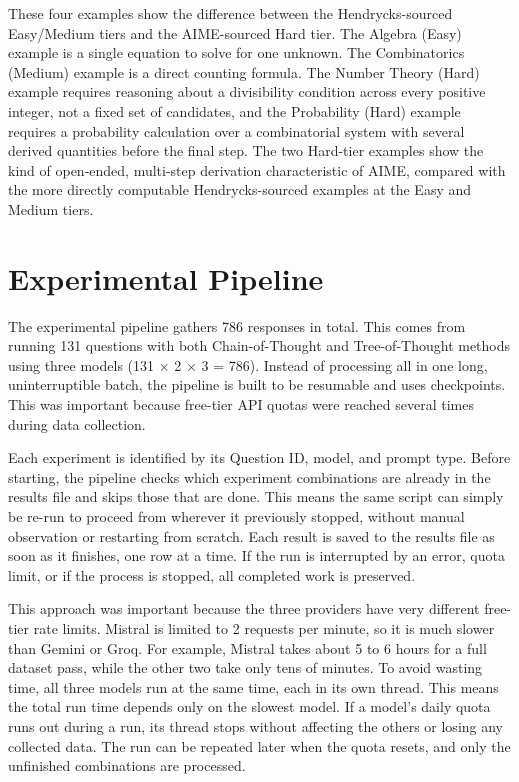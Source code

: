 These four examples show the difference between the Hendrycks-sourced
Easy/Medium tiers and the AIME-sourced Hard tier. The Algebra (Easy)
example is a single equation to solve for one unknown. The
Combinatorics (Medium) example is a direct counting formula. The Number
Theory (Hard) example requires reasoning about a divisibility condition
across every positive integer, not a fixed set of candidates, and the
Probability (Hard) example requires a probability calculation over a
combinatorial system with several derived quantities before the final
step. The two Hard-tier examples show the kind of open-ended,
multi-step derivation characteristic of AIME, compared with the more
directly computable Hendrycks-sourced examples at the Easy and Medium
tiers.

\section{Experimental Pipeline}
\label{sec:pipeline}

The experimental pipeline gathers 786 responses in total. This comes from
running 131 questions with both Chain-of-Thought and Tree-of-Thought
methods using three models (131 $\times$ 2 $\times$ 3 = 786). Instead of
processing all in one long, uninterruptible batch, the pipeline is built
to be resumable and uses checkpoints. This was important because
free-tier API quotas were reached several times during data collection.

Each experiment is identified by its Question ID, model, and prompt type.
Before starting, the pipeline checks which experiment combinations are
already in the results file and skips those that are done. This means
the same script can simply be re-run to proceed from wherever it
previously stopped, without manual observation or restarting from
scratch. Each result is saved to the results file as soon as it
finishes, one row at a time. If the run is interrupted by an error,
quota limit, or if the process is stopped, all completed work is
preserved.

This approach was important because the three providers have very
different free-tier rate limits. Mistral is limited to 2 requests per
minute, so it is much slower than Gemini or Groq. For example, Mistral
takes about 5 to 6 hours for a full dataset pass, while the other two
take only tens of minutes. To avoid wasting time, all three models run
at the same time, each in its own thread. This means the total run time
depends only on the slowest model. If a model's daily quota runs out
during a run, its thread stops without affecting the others or losing
any collected data. The run can be repeated later when the quota
resets, and only the unfinished combinations are processed.

